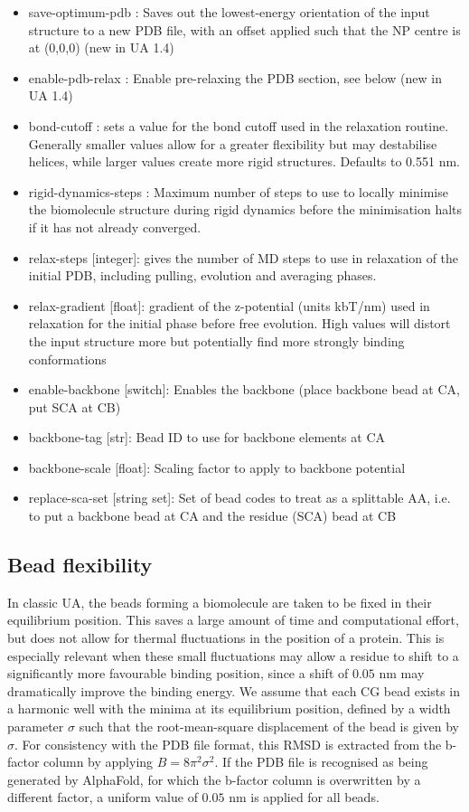 \documentclass[10pt,a4paper,onecolumn]{report}
\begin{document}
\begin{itemize}
\item save-optimum-pdb : Saves out the lowest-energy orientation of the input structure to a new PDB file, with an offset applied such that the NP centre is at (0,0,0) (new in UA 1.4)
\item enable-pdb-relax : Enable pre-relaxing the PDB section, see below (new in UA 1.4)
\item bond-cutoff : sets a value for the bond cutoff used in the relaxation routine. Generally smaller values allow for a greater flexibility but may destabilise helices, while larger values create more rigid structures. Defaults to 0.551 nm. 
\item rigid-dynamics-steps : Maximum number of steps to use to locally minimise the biomolecule structure during rigid dynamics before the minimisation halts if it has not already converged.
\item relax-steps [integer]: gives the number of MD steps to use in relaxation of the initial PDB, including pulling, evolution and averaging phases.
\item relax-gradient [float]: gradient of the z-potential (units kbT/nm) used in relaxation for the initial phase before free evolution. High values will distort the input structure more but potentially find more strongly binding conformations

\item enable-backbone [switch]: Enables the backbone (place backbone bead at CA, put SCA at CB)
\item backbone-tag [str]: Bead ID to use for backbone elements at CA
\item backbone-scale [float]: Scaling factor to apply to backbone potential
\item replace-sca-set [string set]: Set of bead codes to treat as a splittable AA, i.e. to put a backbone bead at CA and the residue (SCA) bead at CB
\end{itemize}
\subsection{Bead flexibility  \label{section:beadflex} }
In classic UA, the beads forming a biomolecule are taken to be fixed in their equilibrium position. This saves a large amount of time and computational effort, but does not allow for thermal fluctuations in the position of a protein. This is especially relevant when these small fluctuations may allow a residue to shift to a significantly more favourable binding position, since a shift of $0.05$ nm may dramatically improve the binding energy. We assume that each CG bead exists in a harmonic well with the minima at its equilibrium position, defined by a width parameter $\sigma$ such that the root-mean-square displacement of the bead is given by $\sigma$. For consistency with the PDB file format, this RMSD is extracted from the b-factor column by applying $B = 8 \pi^2 \sigma^2$. If the PDB file is recognised as being generated by AlphaFold, for which the b-factor column is overwritten by a different factor, a uniform value of $0.05$ nm is applied for all beads. 
\end{document}
